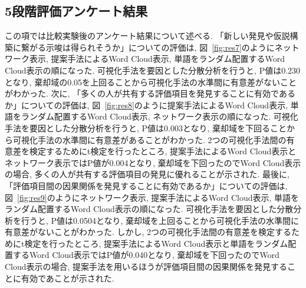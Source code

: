 \documentclass[syuuron]{kuee}
\begin{document}
		\subsection{5段階評価アンケート結果}
		この項では比較実験後のアンケート結果について述べる. 
		「新しい発見や仮説構築に繋がる示唆は得られそうか」についての評価は, 図~\ref{fig:res7}のようにネットワーク表示, 提案手法によるWord Cloud表示, 単語をランダム配置するWord Cloud表示の順になった. 
		可視化手法を要因とした分散分析を行うと, P値は0.230となり, 棄却域の0.05を上回ることから可視化手法の水準間に有意差がないことがわかった. 
		次に, 「多くの人が共有する評価項目を発見することに有効であるか」についての評価は, 図~\ref{fig:res8}のように提案手法によるWord Cloud表示, 単語をランダム配置するWord Cloud表示, ネットワーク表示の順になった. 
		可視化手法を要因とした分散分析を行うと, P値は0.003となり, 棄却域を下回ることから可視化手法の水準間に有意差があることがわかった. 
		2つの可視化手法間の有意差を検定するためにt検定を行ったところ, 提案手法によるWord Cloud表示とネットワーク表示ではP値が0.004となり, 
		棄却域を下回ったのでWord Cloud表示の場合, 多くの人が共有する評価項目の発見に優れることが示された. 
		最後に, 「評価項目間の因果関係を発見することに有効であるか」についての評価は, 図~\ref{fig:res9}のようにネットワーク表示, 提案手法によるWord Cloud表示, 単語をランダム配置するWord Cloud表示の順になった. 
		可視化手法を要因とした分散分析を行うと, P値は0.0504となり, 棄却域を上回ることから可視化手法の水準間に有意差がないことがわかった. 
		しかし, 2つの可視化手法間の有意差を検定するためにt検定を行ったところ, 提案手法によるWord Cloud表示と単語をランダム配置するWord Cloud表示ではP値が0.040となり, 
		棄却域を下回ったのでWord Cloud表示の場合, 提案手法を用いるほうが評価項目間の因果関係を発見することに有効であことが示された. 
	
\end{document}
